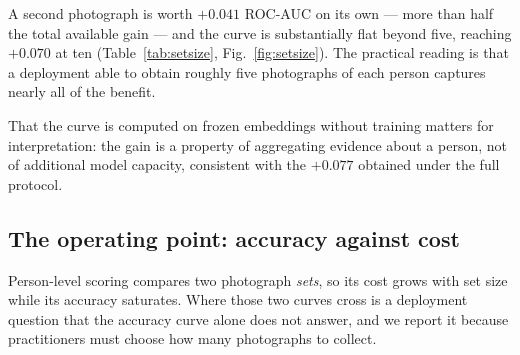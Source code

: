 \documentclass[preprint,12pt]{elsarticle}
\begin{document}
A second photograph is worth $+0.041$ ROC-AUC on its own --- more than half the
total available gain --- and the curve is substantially flat beyond five,
reaching $+0.070$ at ten (Table~\ref{tab:setsize}, Fig.~\ref{fig:setsize}).
The practical reading is that a deployment able to obtain roughly five
photographs of each person captures nearly all of the benefit.

That the curve is computed on frozen embeddings without training matters for
interpretation: the gain is a property of aggregating evidence about a person,
not of additional model capacity, consistent with the $+0.077$ obtained under
the full protocol.

\subsection{The operating point: accuracy against cost}
\label{sec:opcost}

Person-level scoring compares two photograph \emph{sets}, so its cost grows
with set size while its accuracy saturates. Where those two curves cross is a
deployment question that the accuracy curve alone does not answer, and we
report it because practitioners must choose how many photographs to collect.

\begin{table}[t]
\centering
\caption{Accuracy and cost against photographs per person. ROC-AUC is measured
on FIW; timings are per pair on one CPU core at $512$ dimensions. Accuracy is
flat beyond five photographs while cost continues to grow, which makes five a
natural operating point.}
\label{tab:opcost}
\small
{}
\end{table}
\end{document}
